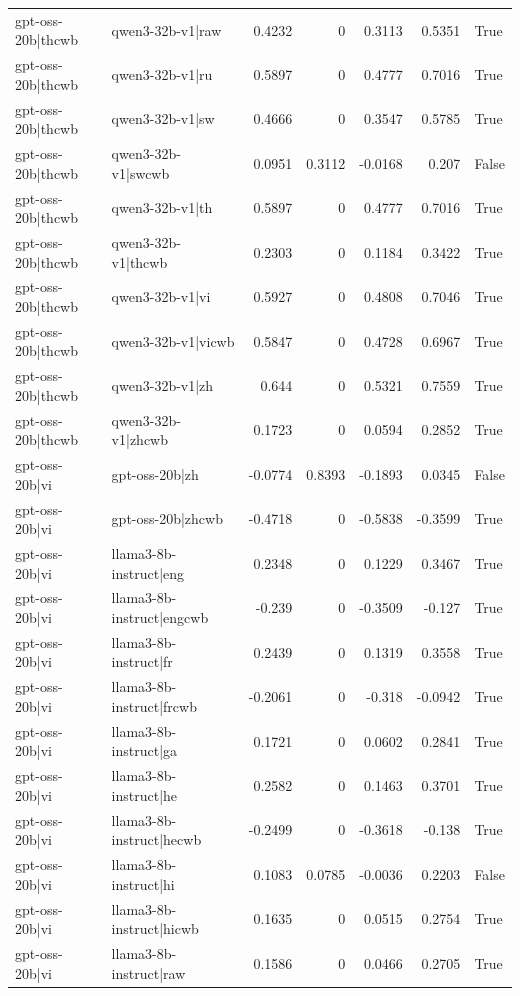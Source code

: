 \begin{table}
\begin{tabular}{l l r r r r l}
gpt-oss-20b|thcwb & qwen3-32b-v1|raw & 0.4232 & 0 & 0.3113 & 0.5351 & True \\
gpt-oss-20b|thcwb & qwen3-32b-v1|ru & 0.5897 & 0 & 0.4777 & 0.7016 & True \\
gpt-oss-20b|thcwb & qwen3-32b-v1|sw & 0.4666 & 0 & 0.3547 & 0.5785 & True \\
gpt-oss-20b|thcwb & qwen3-32b-v1|swcwb & 0.0951 & 0.3112 & -0.0168 & 0.207 & False \\
gpt-oss-20b|thcwb & qwen3-32b-v1|th & 0.5897 & 0 & 0.4777 & 0.7016 & True \\
gpt-oss-20b|thcwb & qwen3-32b-v1|thcwb & 0.2303 & 0 & 0.1184 & 0.3422 & True \\
gpt-oss-20b|thcwb & qwen3-32b-v1|vi & 0.5927 & 0 & 0.4808 & 0.7046 & True \\
gpt-oss-20b|thcwb & qwen3-32b-v1|vicwb & 0.5847 & 0 & 0.4728 & 0.6967 & True \\
gpt-oss-20b|thcwb & qwen3-32b-v1|zh & 0.644 & 0 & 0.5321 & 0.7559 & True \\
gpt-oss-20b|thcwb & qwen3-32b-v1|zhcwb & 0.1723 & 0 & 0.0594 & 0.2852 & True \\
gpt-oss-20b|vi & gpt-oss-20b|zh & -0.0774 & 0.8393 & -0.1893 & 0.0345 & False \\
gpt-oss-20b|vi & gpt-oss-20b|zhcwb & -0.4718 & 0 & -0.5838 & -0.3599 & True \\
gpt-oss-20b|vi & llama3-8b-instruct|eng & 0.2348 & 0 & 0.1229 & 0.3467 & True \\
gpt-oss-20b|vi & llama3-8b-instruct|engcwb & -0.239 & 0 & -0.3509 & -0.127 & True \\
gpt-oss-20b|vi & llama3-8b-instruct|fr & 0.2439 & 0 & 0.1319 & 0.3558 & True \\
gpt-oss-20b|vi & llama3-8b-instruct|frcwb & -0.2061 & 0 & -0.318 & -0.0942 & True \\
gpt-oss-20b|vi & llama3-8b-instruct|ga & 0.1721 & 0 & 0.0602 & 0.2841 & True \\
gpt-oss-20b|vi & llama3-8b-instruct|he & 0.2582 & 0 & 0.1463 & 0.3701 & True \\
gpt-oss-20b|vi & llama3-8b-instruct|hecwb & -0.2499 & 0 & -0.3618 & -0.138 & True \\
gpt-oss-20b|vi & llama3-8b-instruct|hi & 0.1083 & 0.0785 & -0.0036 & 0.2203 & False \\
gpt-oss-20b|vi & llama3-8b-instruct|hicwb & 0.1635 & 0 & 0.0515 & 0.2754 & True \\
gpt-oss-20b|vi & llama3-8b-instruct|raw & 0.1586 & 0 & 0.0466 & 0.2705 & True \\

\end{tabular}
\end{table}
